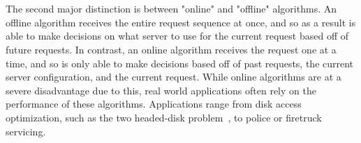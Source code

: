 \\ \\
The second major distinction is between "online" and "offline" algorithms. An offline algorithm receives the entire request sequence at once, and so as a result is able to make decisions on what server to use for the current request based off of future requests. In contrast, an online algorithm receives the request one at a time, and so is only able to make decisions based off of past requests, the current server configuration, and the current request. While online algorithms are at a severe disadvantage due to this, real world applications often rely on the performance of these algorithms. Applications range from disk access optimization, such as the two headed-disk problem~\cite{OnlineComp1998}, to police or firetruck servicing.